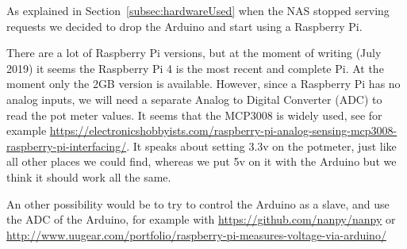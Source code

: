 As explained in Section~\ref{subsec:hardwareUsed} when the NAS stopped serving requests we decided to drop the Arduino and start using a Raspberry Pi.

There are a lot of Raspberry Pi versions, but at the moment of writing (July 2019) it seems the Raspberry Pi 4 is the most recent and complete Pi.
At the moment only the 2GB version is available.
However, since a Raspberry Pi has no analog inputs, we will need a separate Analog to Digital Converter (ADC) to read the pot meter values.
It seems that the MCP3008 is widely used, see for example \url{https://electronicshobbyists.com/raspberry-pi-analog-sensing-mcp3008-raspberry-pi-interfacing/}.
It speaks about setting 3.3v on the potmeter, just like all other places we could find, whereas we put 5v on it with the Arduino but we think it should work all the same.

An other possibility would be to try to control the Arduino as a slave, and use the ADC of the Arduino, for example with \url{https://github.com/nanpy/nanpy} or \url{http://www.uugear.com/portfolio/raspberry-pi-measures-voltage-via-arduino/}